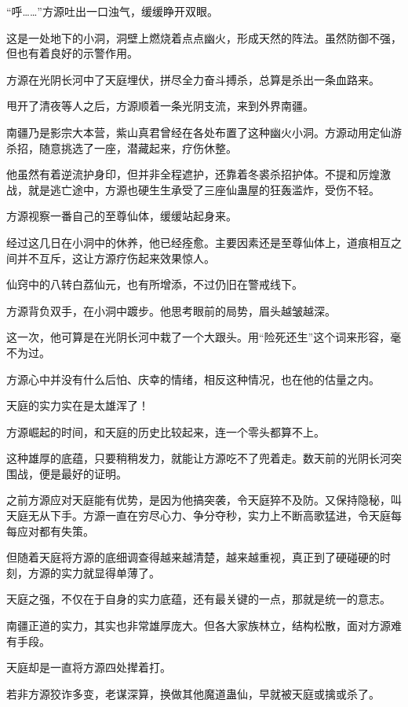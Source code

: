
\begin{this_body}

“呼……”方源吐出一口浊气，缓缓睁开双眼。

这是一处地下的小洞，洞壁上燃烧着点点幽火，形成天然的阵法。虽然防御不强，但也有着良好的示警作用。

方源在光阴长河中了天庭埋伏，拼尽全力奋斗搏杀，总算是杀出一条血路来。

甩开了清夜等人之后，方源顺着一条光阴支流，来到外界南疆。

南疆乃是影宗大本营，紫山真君曾经在各处布置了这种幽火小洞。方源动用定仙游杀招，随意挑选了一座，潜藏起来，疗伤休整。

他虽然有着逆流护身印，但并非全程遮护，还靠着冬裘杀招护体。不提和厉煌激战，就是逃亡途中，方源也硬生生承受了三座仙蛊屋的狂轰滥炸，受伤不轻。

方源视察一番自己的至尊仙体，缓缓站起身来。

经过这几日在小洞中的休养，他已经痊愈。主要因素还是至尊仙体上，道痕相互之间并不互斥，这让方源疗伤起来效果惊人。

仙窍中的八转白荔仙元，也有所增添，不过仍旧在警戒线下。

方源背负双手，在小洞中踱步。他思考眼前的局势，眉头越皱越深。

这一次，他可算是在光阴长河中栽了一个大跟头。用“险死还生”这个词来形容，毫不为过。

方源心中并没有什么后怕、庆幸的情绪，相反这种情况，也在他的估量之内。

天庭的实力实在是太雄浑了！

方源崛起的时间，和天庭的历史比较起来，连一个零头都算不上。

这种雄厚的底蕴，只要稍稍发力，就能让方源吃不了兜着走。数天前的光阴长河突围战，便是最好的证明。

之前方源应对天庭能有优势，是因为他搞突袭，令天庭猝不及防。又保持隐秘，叫天庭无从下手。方源一直在穷尽心力、争分夺秒，实力上不断高歌猛进，令天庭每每应对都有失策。

但随着天庭将方源的底细调查得越来越清楚，越来越重视，真正到了硬碰硬的时刻，方源的实力就显得单薄了。

天庭之强，不仅在于自身的实力底蕴，还有最关键的一点，那就是统一的意志。

南疆正道的实力，其实也非常雄厚庞大。但各大家族林立，结构松散，面对方源难有手段。

天庭却是一直将方源四处撵着打。

若非方源狡诈多变，老谋深算，换做其他魔道蛊仙，早就被天庭或擒或杀了。


\end{this_body}
